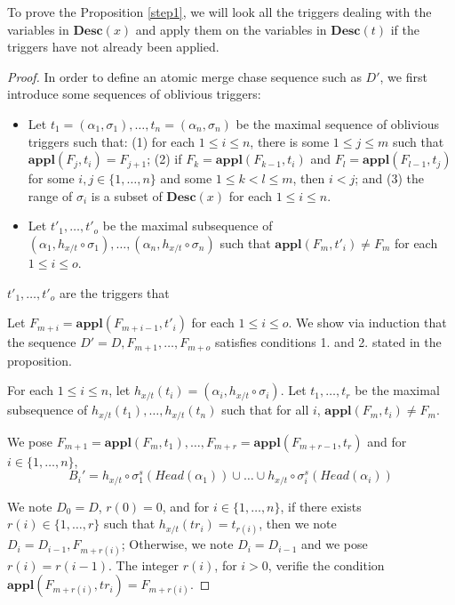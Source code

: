 \documentclass{article}
\theoremstyle{definition}
\theoremstyle{remark}
\newcommand{\Appl}{\textbf{appl}}
\newcommand{\des}{\textbf{Desc}}
\begin{document}
To prove the Proposition \ref{step1}, we will look all the triggers dealing with the variables in $\des(x)$ and apply them on the variables in $\des(t)$ if the triggers have not already been applied.

\begin{proof}
In order to define an atomic merge chase sequence such as $D'$, we first introduce some sequences of oblivious triggers:
\begin{itemize}
\item Let $t_1 = (\alpha_1,\sigma_1),\ldots, t_n =(\alpha_n,\sigma_n)$ be the maximal sequence of oblivious triggers such that:
(1) for each $1 \leq i \leq n$, there is some $1 \leq j \leq m$ such that $\Appl(F_j, t_i) = F_{j+1}$;
(2) if $F_k = \Appl(F_{k-1}, t_i)$ and $F_l = \Appl(F_{l-1},t_j)$ for some $i, j \in \{1, \ldots, n\}$ and  some $1 \leq k < l \leq m$, then $i<j$; and (3) the range of $\sigma_i$ is a subset of $\des(x)$ for each $1 \leq i \leq n$.
\item Let $t'_1, \ldots, t'_o$ be the maximal subsequence of $(\alpha_1, h_{x/t} \circ \sigma_1), \ldots, (\alpha_n, h_{x/t} \circ \sigma_n)$ such that $\Appl(F_{m}, t'_i) \neq F_{m}$ for each $1 \leq i \leq o$.
\end{itemize}

$t'_1, \ldots, t'_o$ are the triggers that \todo{}

Let $F_{m+i} = \Appl(F_{m+i-1}, t'_i)$ for each $1 \leq i \leq o$.
We show via induction that the sequence $D' = D, F_{m+1}, \ldots, F_{m+o}$ satisfies conditions 1. and 2. stated in the proposition.


For each $1 \leq i \leq n$, let $h_{x/t}(t_i) = (\alpha_i, h_{x/t} \circ \sigma_i)$.
Let $t_1, \ldots, t_r$ be the maximal subsequence of $h_{x/t}(t_1), \ldots, h_{x/t}(t_n)$ such that for all $i$, $\Appl(F_{m}, t_i) \neq F_{m}$.


We pose $F_{m+1} = \Appl(F_m,t_1),\ldots, F_{m+r} = \Appl(F_{m+r-1},t_r)$ and for $i \in \{1,\ldots,n\}$, $$B_i' = {h_{x/t} \circ \sigma_1^s}(Head(\alpha_1)) \cup \ldots \cup {h_{x/t} \circ \sigma^s_i}(Head(\alpha_{i}))$$

We note $D_0 = D$, $r(0) = 0$, and for $i \in \{1,\ldots,n\}$, if there exists $r(i) \in \{1,\ldots,r\}$ such that $h_{x/t}(tr_i) = t_{r(i)}$, then we note $D_i = D_{i-1},F_{m+r(i)}$; Otherwise, we note $D_i = D_{i-1}$ and we pose $r(i) = r(i-1)$. The integer $r(i)$, for $i >0$, verifie the condition $\Appl(F_{m+r(i)},tr_i) =  F_{m+r(i)}$.


\end{proof}
\end{document}
